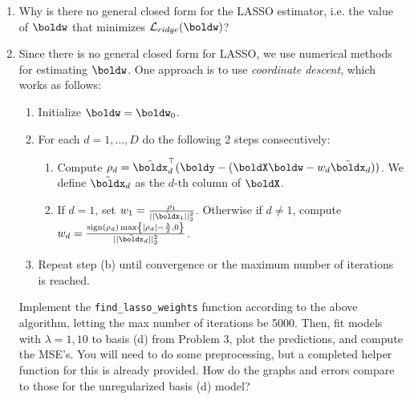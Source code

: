 \documentclass[submit]{../harvardml}
\begin{document}
\begin{problem}
\begin{enumerate}
    \item Why is there no general closed form for the LASSO estimator, i.e. the value of $\boldw$ that minimizes $\mathcal{L}_{ridge}(\boldw)$?

    \item Since there is no general closed form for LASSO, we use numerical methods for estimating $\boldw$. One approach is to use \textit{coordinate descent}, which works as follows: 
    \begin{enumerate}
        \item Initialize $\boldw=\boldw_0$.
        \item For each $d=1, \ldots, D$ do the following 2 steps consecutively:
        \begin{enumerate}
            \item Compute $\rho_d = \tilde{\boldx}_d^\top(\boldy - (\boldX \boldw - w_d \tilde{\boldx}_d))$. We define $\tilde{\boldx}_d$ as the $d$-th column of $\boldX$.

            \item If $d=1$, set $w_1 = \frac{\rho_1}{||\tilde{\boldx}_1||^2_2}$. Otherwise if $d\ne 1$, compute $w_d = \frac{\text{sign}(\rho_d)\max\left\{|\rho_d|-\frac{\lambda}{2}, 0\right\}}{||\tilde{\boldx}_d||^2_2}$.
        \end{enumerate}
        \item Repeat step (b) until convergence or the maximum number of iterations is reached.
    \end{enumerate} 

    Implement the \texttt{find\_lasso\_weights} function according to the above algorithm, letting the max number of iterations be 5000. Then, fit models with $\lambda=1, 10$ to basis (d) from Problem 3, plot the predictions, and compute the MSE's. You will need to do some preprocessing, but a completed helper function for this is already provided. How do the graphs and errors compare to those for the unregularized basis (d) model? 


\end{enumerate}

\end{problem}
\end{document}
